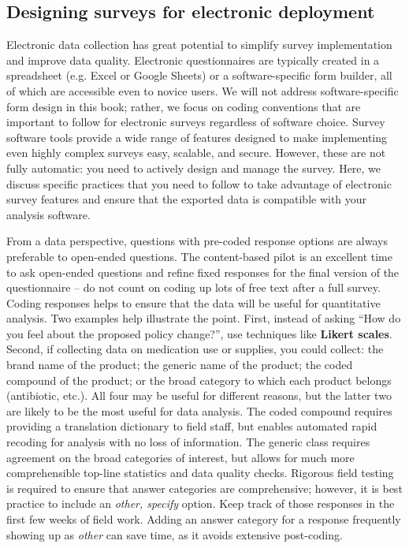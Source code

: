 \subsection{Designing surveys for electronic deployment}

Electronic data collection has great potential to simplify survey implementation and improve data quality.
Electronic questionnaires are typically created in a spreadsheet (e.g. Excel or Google Sheets)
or a software-specific form builder, all of which are accessible even to novice users.
We will not address software-specific form design in this book;
rather, we focus on coding conventions that are important to follow
for electronic surveys regardless of software choice.
Survey software tools provide a wide range of features
designed to make implementing even highly complex surveys easy, scalable, and secure.
However, these are not fully automatic: you need to actively design and manage the survey.
Here, we discuss specific practices that you need to follow
to take advantage of electronic survey features
and ensure that the exported data is compatible with your analysis software.

From a data perspective, questions with pre-coded response options
are always preferable to open-ended questions.
The content-based pilot is an excellent time to ask open-ended questions
and refine fixed responses for the final version of the questionnaire --
do not count on coding up lots of free text after a full survey.
Coding responses helps to ensure that the data will be useful for quantitative analysis.
Two examples help illustrate the point.
First, instead of asking ``How do you feel about the proposed policy change?'',
use techniques like \textbf{Likert scales}.
Second, if collecting data on medication use or supplies, you could collect:
the brand name of the product; the generic name of the product; the coded compound of the product;
or the broad category to which each product belongs (antibiotic, etc.).
All four may be useful for different reasons,
but the latter two are likely to be the most useful for data analysis.
The coded compound requires providing a translation dictionary to field staff,
but enables automated rapid recoding for analysis with no loss of information.
The generic class requires agreement on the broad categories of interest,
but allows for much more comprehensible top-line statistics and data quality checks.
Rigorous field testing is required to ensure that answer categories are comprehensive;
however, it is best practice to include an \textit{other, specify} option.
Keep track of those responses in the first few weeks of field work.
Adding an answer category for a response frequently showing up as \textit{other} can save time,
as it avoids extensive post-coding.

